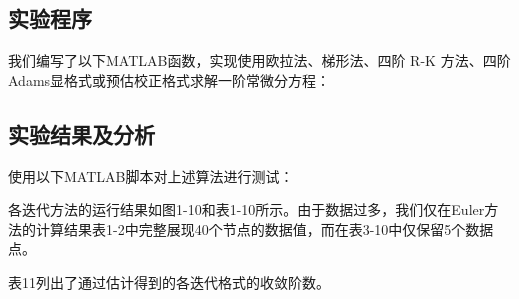 \documentclass[12pt, a4paper, oneside]{ctexart}
\begin{document}
\subsection{实验程序}
我们编写了以下MATLAB函数，实现使用欧拉法、梯形法、四阶 R-K 方法、四阶Adams显格式或预估校正格式求解一阶常微分方程：



\subsection{实验结果及分析}
使用以下MATLAB脚本对上述算法进行测试：



各迭代方法的运行结果如图1-10和表1-10所示。由于数据过多，我们仅在Euler方法的计算结果表1-2中完整展现40个节点的数据值，而在表3-10中仅保留5个数据点。

表11列出了通过估计得到的各迭代格式的收敛阶数。

\setlength{\tabcolsep}{3pt}

\end{document}
